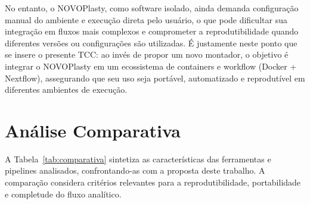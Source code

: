 No entanto, o NOVOPlasty, como software isolado, ainda demanda configuração manual do ambiente e execução direta pelo usuário, o que pode dificultar sua integração em fluxos mais complexos e comprometer a reprodutibilidade quando diferentes versões ou configurações são utilizadas. É justamente neste ponto que se insere o presente TCC: ao invés de propor um novo montador, o objetivo é integrar o NOVOPlasty em um ecossistema de containers e workflow (Docker + Nextflow), assegurando que seu uso seja portável, automatizado e reprodutível em diferentes ambientes de execução.

\section{Análise Comparativa}

A Tabela~\ref{tab:comparativa} sintetiza as características das ferramentas e pipelines analisados, confrontando-as com a proposta deste trabalho. A comparação considera critérios relevantes para a reprodutibilidade, portabilidade e completude do fluxo analítico.

